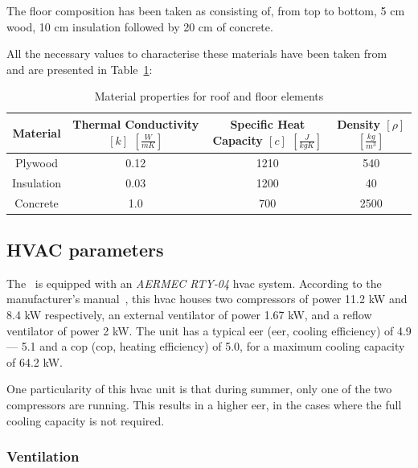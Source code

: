 
The floor composition has been taken as consisting of, from top to bottom, 5 cm
wood, 10 cm insulation followed by 20 cm of concrete. 

All the necessary values to characterise these materials have been taken
from~\cite{BuildingsHeatTransferData} and are presented in
Table~\ref{tab:material_properties}: 

\begin{table}[ht]
\centering
    \begin{tabular}{||c c c c||}
        \hline
        Material & Thermal Conductivity $[k]$ $[\frac{W}{mK}]$ & Specific Heat
        Capacity $[c]$ $[\frac{J}{kgK}]$ & Density $[\rho]$ $[\frac{kg}{m^3}]$
        \\
        \hline \hline
        Plywood & 0.12 & 1210 & 540 \\
        Insulation & 0.03 & 1200 & 40 \\
        Concrete & 1.0 & 700 & 2500 \\
        \hline
    \end{tabular}
    \caption{Material properties for roof and floor elements}
\label{tab:material_properties}
\end{table}

\subsection{HVAC parameters}\label{sec:HVAC_parameters}

The \pdome\ is equipped with an \textit{AERMEC RTY-04} \acrshort{hvac} system.
According to the manufacturer's manual~\cite{aermecRoofTopManuelSelection}, this
\acrshort{hvac} houses two compressors of power 11.2 kW and 8.4 kW respectively,
an external ventilator of power 1.67 kW, and a reflow ventilator of power 2 kW.
The unit has a typical \acrlong{eer} (\acrshort{eer}, cooling efficiency) of 4.9
--- 5.1 and a \acrlong{cop} (\acrshort{cop}, heating efficiency) of 5.0, for a
maximum cooling capacity of 64.2 kW. 

One particularity of this \acrshort{hvac} unit is that during summer, only one
of the two compressors are running. This results in a higher \acrlong{eer}, in
the cases where the full cooling capacity is not required.

\subsubsection*{Ventilation}

